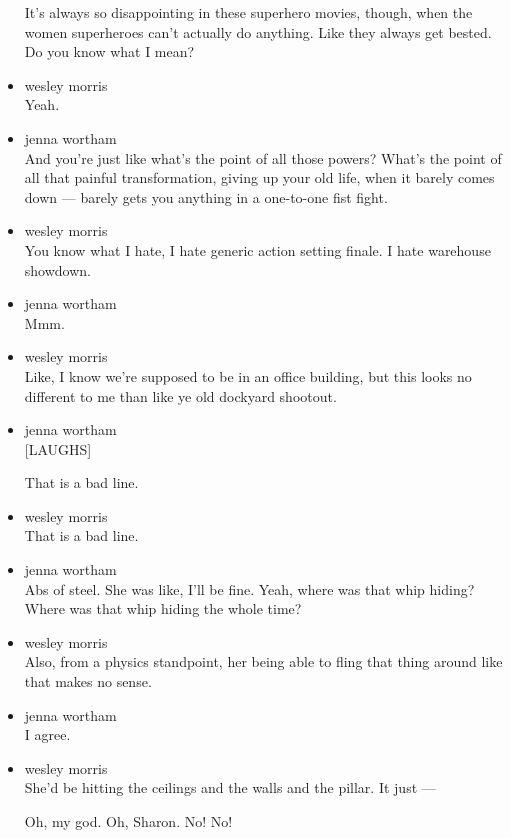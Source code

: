 \begin{itemize}
  It's always so disappointing in these superhero movies, though, when
  the women superheroes can't actually do anything. Like they always get
  bested. Do you know what I mean?
\item
  wesley morris\\
  Yeah.
\item
  jenna wortham\\
  And you're just like what's the point of all those powers? What's the
  point of all that painful transformation, giving up your old life,
  when it barely comes down --- barely gets you anything in a one-to-one
  fist fight.
\item
  wesley morris\\
  You know what I hate, I hate generic action setting finale. I hate
  warehouse showdown.
\item
  jenna wortham\\
  Mmm.
\item
  wesley morris\\
  Like, I know we're supposed to be in an office building, but this
  looks no different to me than like ye old dockyard shootout.
\item
  jenna wortham\\
  {[}LAUGHS{]}

  That is a bad line.
\item
  wesley morris\\
  That is a bad line.
\item
  jenna wortham\\
  Abs of steel. She was like, I'll be fine. Yeah, where was that whip
  hiding? Where was that whip hiding the whole time?
\item
  wesley morris\\
  Also, from a physics standpoint, her being able to fling that thing
  around like that makes no sense.
\item
  jenna wortham\\
  I agree.
\item
  wesley morris\\
  She'd be hitting the ceilings and the walls and the pillar. It just
  ---

  Oh, my god. Oh, Sharon. No! No!


\end{itemize}
